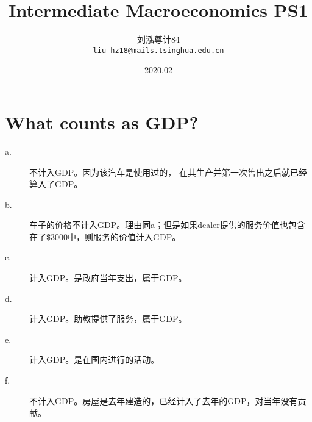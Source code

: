 \documentclass[UTF8, onecolumn, a4paper]{article}
\title{\textbf{Intermediate Macroeconomics PS1}}%
\author{刘泓尊\quad 2018011446\quad 计84 \\ \texttt{liu-hz18@mails.tsinghua.edu.cn} }
\date{2020.02}
\begin{document}
\maketitle

\section{What counts as GDP?}
\begin{description}
\item[a.]不计入GDP。因为该汽车是使用过的， 在其生产并第一次售出之后就已经算入了GDP。
\item[b.]车子的价格不计入GDP。理由同a；但是如果dealer提供的服务价值也包含在了\$3000中，则服务的价值计入GDP。
\item[c.]计入GDP。是政府当年支出，属于GDP。
\item[d.]计入GDP。助教提供了服务，属于GDP。
\item[e.]计入GDP。是在国内进行的活动。
\item[f.]不计入GDP。房屋是去年建造的，已经计入了去年的GDP，对当年没有贡献。
\end{description}
\end{document}
